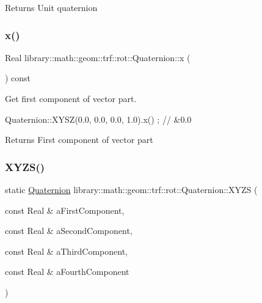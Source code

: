 \begin{DoxyReturn}{Returns}
Unit quaternion 
\end{DoxyReturn}
\mbox{\label{classlibrary_1_1math_1_1geom_1_1trf_1_1rot_1_1_quaternion_abd664a9792b2e039a980e77b861f74dd}} 
\subsubsection{\texorpdfstring{x()}{x()}}
{\footnotesize\ttfamily Real library\+::math\+::geom\+::trf\+::rot\+::\+Quaternion\+::x (\begin{DoxyParamCaption}{ }\end{DoxyParamCaption}) const}



Get first component of vector part. 


\begin{DoxyCode}
Quaternion::XYSZ(0.0, 0.0, 0.0, 1.0).x() ; \textcolor{comment}{// &0.0}
\end{DoxyCode}


\begin{DoxyReturn}{Returns}
First component of vector part 
\end{DoxyReturn}
\mbox{\label{classlibrary_1_1math_1_1geom_1_1trf_1_1rot_1_1_quaternion_ad6426210c54c79fc5296b5375380a7ca}} 
\subsubsection{\texorpdfstring{X\+Y\+Z\+S()}{XYZS()}}
{\footnotesize\ttfamily static \hyperlink{classlibrary_1_1math_1_1geom_1_1trf_1_1rot_1_1_quaternion}{Quaternion} library\+::math\+::geom\+::trf\+::rot\+::\+Quaternion\+::\+X\+Y\+ZS (\begin{DoxyParamCaption}\item[{const Real \&}]{a\+First\+Component,  }\item[{const Real \&}]{a\+Second\+Component,  }\item[{const Real \&}]{a\+Third\+Component,  }\item[{const Real \&}]{a\+Fourth\+Component }\end{DoxyParamCaption})\hspace{0.3cm}{\ttfamily [static]}}



